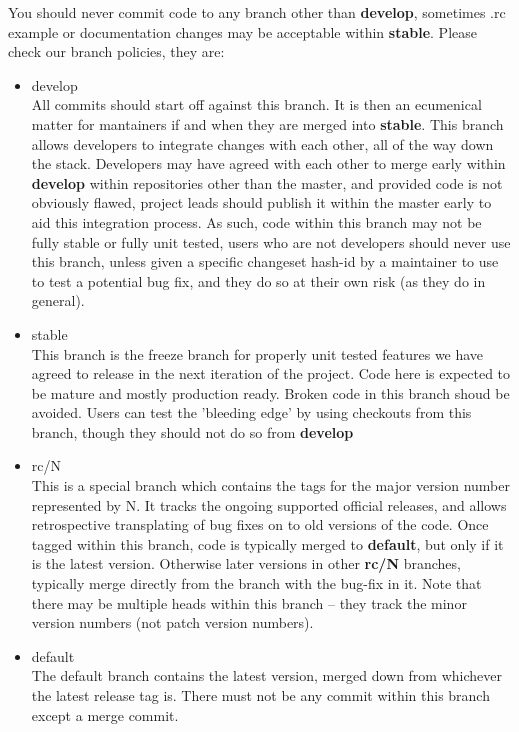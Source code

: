 \documentclass{article}
\begin{document}
You should never commit code to any branch other than \textbf{develop}, sometimes .rc example or documentation
changes may be acceptable within \textbf{stable}.  Please check our branch policies, they are:

\begin{itemize}
\item develop
\\
All commits should start off against this branch.  It is then an ecumenical matter for mantainers
if and when they are merged into \textbf{stable}.  This branch allows developers to integrate changes
with each other, all of the way down the stack.  Developers may have agreed with each other to merge
early within \textbf{develop} within repositories other than the master, and provided code is not
obviously flawed, project leads should publish it within the master early to aid this integration
process.  As such, code within this branch may not be fully stable or fully unit tested, users who are
not developers should never use this branch, unless given a specific changeset hash-id by a maintainer
to use to test a potential bug fix, and they do so at their own risk (as they do in general).
\item stable
\\
This branch is the freeze branch for properly unit tested features we have agreed to release in
the next iteration of the project.  Code here is expected to be mature and mostly production ready.
Broken code in this branch shoud be avoided.  Users can test the 'bleeding edge' by using checkouts
from this branch, though they should not do so from \textbf{develop}
\item rc/N
\\
This is a special branch which contains the tags for the major version number represented by N.
It tracks the ongoing supported official releases, and allows retrospective transplating of bug fixes
on to old versions of the code.  Once tagged within this branch, code is typically merged to
\textbf{default}, but only if it is the latest version.  Otherwise later versions in other \textbf{rc/N}
branches, typically merge directly from the branch with the bug-fix in it.
Note that there may be multiple heads within this branch -- they track the minor version numbers (not patch
version numbers).
\item default
\\
The default branch contains the latest version, merged down from whichever the latest release tag is.
There must not be any commit within this branch except a merge commit.
\\
\end{itemize}
\end{document}
